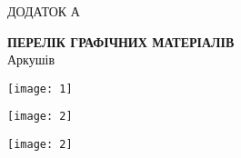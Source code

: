 \documentclass[main.tex]{subfiles}
\begin{document}
\renewcommand\stamppartname{Перелік графічних матеріалів}

\begin{specialpage}
  \MakeUppercase{Додаток А}\\
  \MakeUppercase{\stampname{}}

  \vspace*{\fill}
  \textbf{\MakeUppercase{\stamppartname{}}}\\
  Аркушів \pageref{\lastpagelabel{}}

  \vspace*{\fill}
  \mypagefooter{}
\end{specialpage}

\pagestyle{plain}

\renewcommand\stamppartname{Діаграма варіантів використання}
\begin{center}
\noindent\texttt{[image: 1]}
\end{center}

\renewcommand\stampcode{ІАЛЦ.467100.005.Д2}
\renewcommand\stamppartname{Схема програми}
\begin{center}
\noindent\texttt{[image: 2]}
\end{center}
% 
\renewcommand\stampcode{ІАЛЦ.467100.006.Д3}
\renewcommand\stamppartname{Схема програми}
\begin{center}
\noindent\texttt{[image: 2]}
\end{center}

\finalizepart{}
\end{document}
